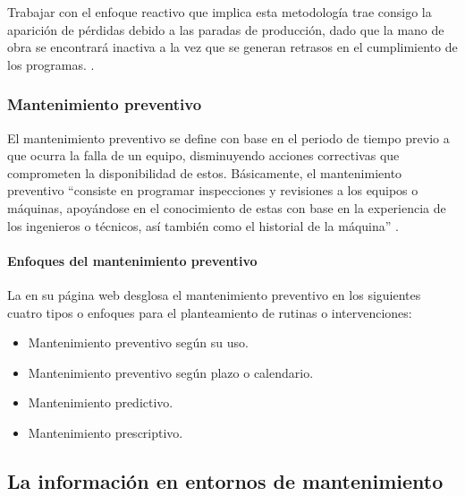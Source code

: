             Trabajar con el enfoque reactivo que implica esta metodología trae consigo la aparición de pérdidas debido a las paradas de producción, dado que la mano de obra se encontrará inactiva a la vez que se generan retrasos en el cumplimiento de los programas. \parencite{GALLARA:2020}.

        \subsubsection{Mantenimiento preventivo}\label{subsec:preventive_maintenance}

            El mantenimiento preventivo se define con base en el periodo de tiempo previo a que ocurra la falla de un equipo, disminuyendo acciones correctivas que comprometen la disponibilidad de estos. Básicamente, el mantenimiento preventivo “consiste en programar inspecciones y revisiones a los equipos o máquinas, apoyándose en el conocimiento de estas con base en la experiencia de los ingenieros o técnicos, así también como el historial de la máquina” \parencite[p. 12]{TOLEDO:2018}.

            \paragraph{Enfoques del mantenimiento preventivo}

                La \textcite{IBM:SF} en su página web desglosa el mantenimiento preventivo en los siguientes cuatro tipos o enfoques para el planteamiento de rutinas o intervenciones:

                \begin{itemize}
                    
                    \item Mantenimiento preventivo según su uso.

                    \item Mantenimiento preventivo según plazo o calendario.

                    \item Mantenimiento predictivo.

                    \item Mantenimiento prescriptivo.

                \end{itemize}

    \subsection{La información en entornos de mantenimiento}

